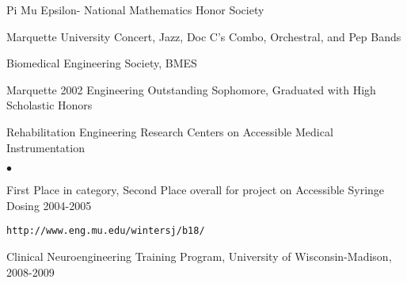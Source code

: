 \documentclass[margin,line]{res}
\newenvironment{list2}{
  \begin{list}{$\bullet$}{%
      \setlength{\itemsep}{0in}
      \setlength{\parsep}{0in} \setlength{\parskip}{0in}
      \setlength{\topsep}{0in} \setlength{\partopsep}{0in} 
      \setlength{\leftmargin}{0.2in}}}{\end{list}}
\begin{document}
\begin{resume}
Pi Mu Epsilon- National Mathematics Honor Society

Marquette University Concert, Jazz, Doc C's Combo, Orchestral, and Pep Bands

Biomedical Engineering Society, BMES

Marquette 2002 Engineering Outstanding Sophomore, Graduated with High Scholastic Honors

Rehabilitation Engineering Research Centers on Accessible Medical Instrumentation
\begin{list2}
 \item First Place in category, Second Place overall for project on Accessible Syringe Dosing 2004-2005
 \item \begin{verbatim}http://www.eng.mu.edu/wintersj/b18/\end{verbatim}
\end{list2}
%

Clinical Neuroengineering Training Program, University of Wisconsin-Madison, 2008-2009



\end{resume}
\end{document}

